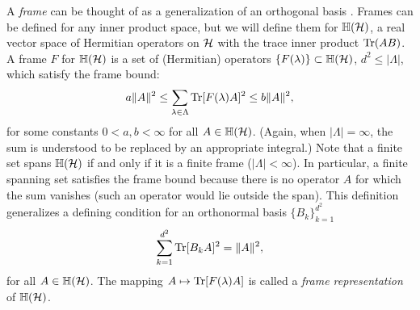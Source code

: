A \emph{frame} can be thought of as a generalization of an orthogonal basis \cite{christensen2003introduction}. Frames can be defined for any inner product space, but we will define them for $\mathbb H(\mathcal{H})$, a real vector space of Hermitian operators on $\mathcal{H}$ with the trace inner product $\mathrm{Tr} (AB)$. A frame $F$ for $\mathbb H(\mathcal{H})$ is a set of (Hermitian) operators $\{ F(\lambda)\}\subset \mathbb H(\mathcal{H})$, $d^2 \le |\Lambda|$, which satisfy the frame bound:
\begin{equation}\label{frame-bound}
a\norm{A}^2\leq\sum_{\lambda\in\Lambda} \Tr[ F(\lambda){A}]^2\leq b\norm{A}^2,
\end{equation}
for some constants $0<a,b< \infty$ for all $A \in \mathbb H(\mathcal{H})$. (Again, when $|\Lambda| = \infty$, the sum is understood to be replaced by an appropriate integral.) Note that a finite set spans $\mathbb H(\mathcal{H})$ if and only if it is a finite frame ($|\Lambda| < \infty$). In particular, a finite spanning set satisfies the frame bound because there is no operator $A$ for which the sum vanishes (such an operator would lie outside the span).  This definition generalizes a defining condition for an orthonormal basis $\{ B_k\}_{k=1}^{d^2}$
\begin{equation}
\sum_{k=1}^{d^2}\mathrm{Tr}[{B_k}{A}]^2 = \|A\|^2,
\end{equation}
for all $A \in \mathbb H(\mathcal{H})$. The mapping $A\mapsto\mathrm{Tr}[ {F(\lambda)}{A}]$ is called a \emph{frame representation} of $\mathbb H(\mathcal{H})$.

